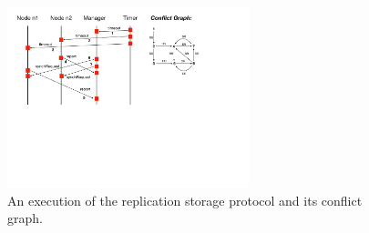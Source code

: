 \begin{figure}[t]
\includegraphics[width=7cm]{MSC-storage.pdf}
\caption{An execution of the replication storage protocol and its conflict graph.}
\label{fig:replic-exec}
\end{figure}
